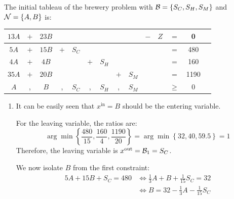 \begin{example}
    The initial tableau of the brewery problem with $\mathcal{B} = \{ S_C, S_H, S_M \}$ and $\mathcal{N} = \{ A, B \}$ is:
    \begin{center}
        \begin{tabular}{cccccccccccccc}
            \toprule
            $13A$ & $+$ & $23B$ & & & & & & & $-$ & $Z$ & $=$ & 0 \\
            \midrule
            $5A$ & $+$ & $15B$ & $+$ & $S_C$ & & & & & & & $=$ & 480 \\
            $4A$ & $+$ & $4B$ & & & $+$ & $S_H$ & & & & & $=$ & 160 \\
            $35A$ & $+$ & $20B$ & & & & & $+$ & $S_M$ & & & $=$ & 1190 \\
            \midrule
            $A$ & , & $B$ & , & $S_C$ & , & $S_H$ & , & $S_M$ & & & $\geq$ & 0 \\
            \bottomrule
        \end{tabular}
    \end{center}

    \begin{enumerate}
        \item 
            It can be easily seen that $x^\text{in} = B$ should be the entering variable.
        
            For the leaving variable, the ratios are:
            \[ \arg\min \left\{ \frac{480}{15}, \frac{160}{4}, \frac{1190}{20} \right\} = \arg\min \left\{ 32, 40, 59.5 \right\} = 1 \]
            Therefore, the leaving variable is $x^\text{out} = \mathcal{B}_1 = S_C$.
        
            We now isolate $B$ from the first constraint:
            \[ 
                \begin{split}
                    5A + 15B + S_C = 480 &\iff \frac{1}{3}A + B + \frac{1}{15}S_C = 32 \\
                        &\iff B = 32 - \frac{1}{3}A - \frac{1}{15}S_C \\
                \end{split}
            \]


\end{enumerate}
\end{example}

